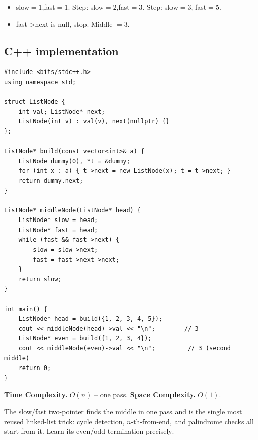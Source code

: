 
\begin{itemize}
  \item slow$=1$,fast$=1$. Step: slow$=2$,fast$=3$. Step: slow$=3$,
        fast$=5$.
  \item fast->next is null, stop. Middle $=3$.
\end{itemize}

\subsection*{C++ implementation}

\begin{lstlisting}
#include <bits/stdc++.h>
using namespace std;

struct ListNode {
    int val; ListNode* next;
    ListNode(int v) : val(v), next(nullptr) {}
};

ListNode* build(const vector<int>& a) {
    ListNode dummy(0), *t = &dummy;
    for (int x : a) { t->next = new ListNode(x); t = t->next; }
    return dummy.next;
}

ListNode* middleNode(ListNode* head) {
    ListNode* slow = head;
    ListNode* fast = head;
    while (fast && fast->next) {
        slow = slow->next;
        fast = fast->next->next;
    }
    return slow;
}

int main() {
    ListNode* head = build({1, 2, 3, 4, 5});
    cout << middleNode(head)->val << "\n";        // 3
    ListNode* even = build({1, 2, 3, 4});
    cout << middleNode(even)->val << "\n";         // 3 (second middle)
    return 0;
}
\end{lstlisting}

\begin{complexitybox}
\textbf{Time Complexity.} $O(n)$ -- one pass. \textbf{Space Complexity.}
$O(1)$.
\end{complexitybox}

\begin{takeawaybox}
The slow/fast two-pointer finds the middle in one pass and is the single
most reused linked-list trick: cycle detection, $n$-th-from-end, and
palindrome checks all start from it. Learn its even/odd termination
precisely.
\end{takeawaybox}
